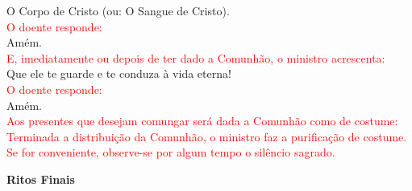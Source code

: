 \documentclass{book}
\begin{document}
\begin{flushleft}
    O Corpo de Cristo (ou: O Sangue de Cristo).
    \vspace{.1cm} \\
    \textcolor{red}{O doente responde:}
    \vspace{.1cm} \\
    Amém.
    \vspace{.1cm} \\
    \textcolor{red}{E, imediatamente ou depois de ter dado a Comunhão, o ministro acrescenta:}
    \vspace{.1cm} \\
    Que ele te guarde e te conduza à vida eterna!
    \vspace{.1cm} \\
    \textcolor{red}{O doente responde:}
    \vspace{.1cm} \\
    Amém.
    \vspace{.1cm} \\
    \textcolor{red}{Aos presentes que desejam comungar será dada a Comunhão como de costume:}
    \vspace{.1cm} \\
    \textcolor{red}{Terminada a distribuição da Comunhão, o ministro faz a purificação de costume. Se for conveniente, observe-se por algum tempo o silêncio sagrado.}
\end{flushleft}
\begin{center}
    \textbf{Ritos Finais}
\end{center}
\end{document}
